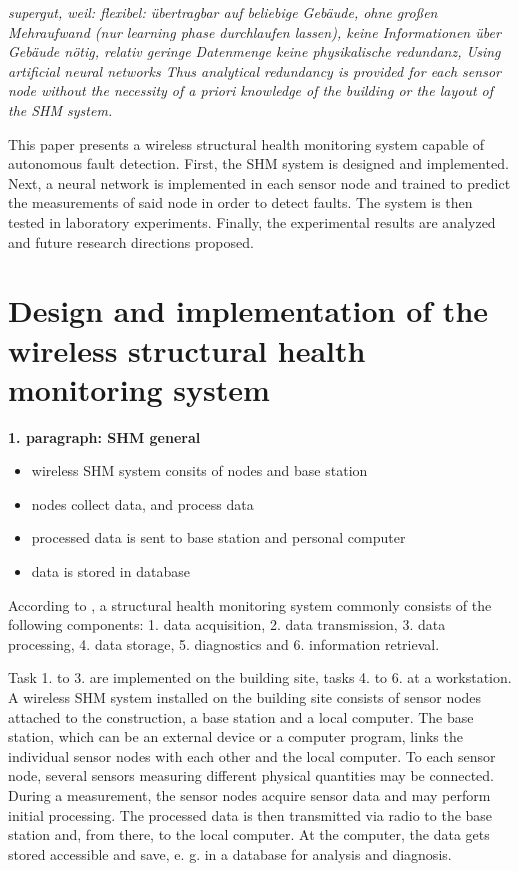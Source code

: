\documentclass[12pt]{scrartcl}
\begin{document}
\textit{supergut, weil: flexibel:
übertragbar auf beliebige Gebäude, ohne großen Mehraufwand (nur learning phase durchlaufen lassen), keine Informationen über Gebäude nötig,
relativ geringe Datenmenge
keine physikalische redundanz, 
Using artificial neural networks 
Thus analytical redundancy is provided for each sensor node without the necessity of a priori knowledge of the building or the layout of the SHM system.}


This paper presents a wireless structural health monitoring system capable of autonomous fault detection. 
First, the SHM system is designed and implemented. 
Next, a neural network is implemented in each sensor node and trained to predict the measurements of said node in order to detect faults. 
The system is then tested in laboratory experiments. 
Finally, the experimental results are analyzed and future research directions proposed.



\newpage

\section*{Design and implementation of the wireless structural health monitoring system}

\textbf{1. paragraph: SHM general}

\begin{itemize}
\item wireless SHM system consits of nodes and base station
\item nodes collect data, and process data
\item processed data is sent to base station and personal computer
\item data is stored in database
\end{itemize}


According to \cite[5]{BisbySHM}, a structural health monitoring system commonly consists of the following components:
1. data acquisition,
2. data transmission, 
3. data processing,
4. data storage,
5. diagnostics and 
6. information retrieval.

Task 1. to 3. are implemented on the building site, tasks 4. to 6. at a workstation. 
A wireless SHM system installed on the building site consists of sensor nodes attached to the construction, a base station and a local computer. 
The base station, which can be an external device or a computer program, links the individual sensor nodes with each other and the local computer.
To each sensor node, several sensors measuring different physical quantities may be connected. 
During a measurement, the sensor nodes acquire sensor data and may perform initial processing.
The processed data is then transmitted via radio to the base station and, from there, to the local computer. 
At the computer, the data gets stored accessible and save, e. g. in a database for analysis and diagnosis.
\end{document}

